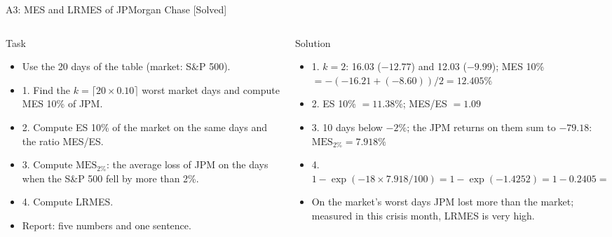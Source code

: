 \begin{frame}{A3: MES and LRMES of JPMorgan Chase [Solved]}
\itemsize{\scriptsize}
\begin{columns}[T]
\begin{column}{0.47\textwidth}
\begin{block}{Task}
\begin{itemize}
    \item Use the 20 days of the table (market: S\&P 500).
    \item 1. Find the $k = \lceil 20 \times 0.10 \rceil$ worst market days and compute MES 10\% of JPM.
    \item 2. Compute ES 10\% of the market on the same days and the ratio MES/ES.
    \item 3. Compute $\mathrm{MES}_{2\%}$: the average loss of JPM on the days when the S\&P 500 fell by more than 2\%.
    \item 4. Compute LRMES.
    \item Report: five numbers and one sentence.
\end{itemize}
\end{block}
\end{column}
\begin{column}{0.49\textwidth}
\begin{exampleblock}{Solution}
\begin{itemize}
    \item 1. $k = 2$: 16.03 ($-12.77$) and 12.03 ($-9.99$); MES 10\% $= -(-16.21 + (-8.60))/2 = 12.405\%$
    \item 2. ES 10\% $= 11.38\%$; MES/ES $= 1.09$
    \item 3. 10 days below $-2\%$; the JPM returns on them sum to $-79.18$: $\mathrm{MES}_{2\%} = 7.918\%$
    \item 4. $1 - \exp(-18 \times 7.918/100) = 1 - \exp(-1.4252) = 1 - 0.2405 = 75.95\%$
    \item On the market's worst days JPM lost more than the market; measured in this crisis month, LRMES is very high.
\end{itemize}
\end{exampleblock}
\end{column}
\end{columns}
\end{frame}

